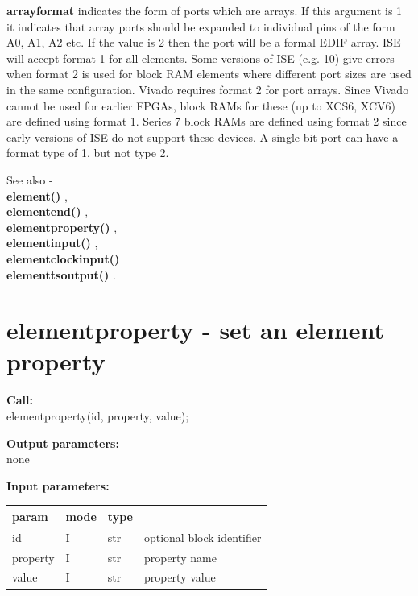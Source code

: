         {\bf arrayformat} indicates the form of ports which are arrays.
        If this argument is 1 it indicates that array ports should be
        expanded to individual pins of the form A0, A1, A2 etc. If the value
        is 2 then the port will be a formal EDIF array. ISE will accept format
        1 for all elements. Some versions of ISE (e.g. 10) give errors when
        format 2 is used for block RAM elements where different port sizes
        are used in the same configuration. Vivado requires format 2 for port
        arrays. Since Vivado cannot be used for earlier FPGAs, block RAMs for
        these (up to XCS6, XCV6) are defined using format 1. Series 7 block RAMs
        are defined using format 2 since early versions of ISE do not support
        these devices. A single bit port can have a format type of 1, but not
        type 2.

        See also - \\
        {\bf element()} , \\
        {\bf elementend()} , \\
        {\bf elementproperty()} , \\
        {\bf elementinput()} , \\
        {\bf elementclockinput()}  \\
        {\bf elementtsoutput()} .






    \section{elementproperty - set an element property}\label{sec:ipelementproperty}
        
        {\bf Call:} \\
        elementproperty(id, property, value);
        
        {\bf Output parameters:} \\
        none
        
        {\bf Input parameters:} \\
        \begin{tabular}{| l | l | l | l |}
        \hline
        param  & mode     & type  & \\
        \hline \hline
        id       & I        & str & optional block identifier \\ \hline
        property & I        & str & property name             \\ \hline
        value    & I        & str & property value            \\ \hline
        \end{tabular}
        
